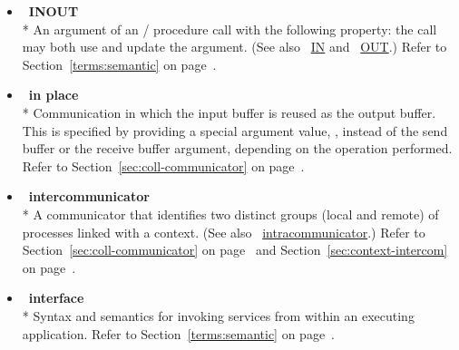 \begin{itemize}
\label{glossary:INOUT}
\item  ~\hypertarget{glossary:INOUT}{\textbf{INOUT}} \\*
An argument of an \MPI/ procedure call with the following property: the call may both use and update the argument.
(See also ~\hyperlink{glossary:IN}{IN} and ~\hyperlink{glossary:OUT}{OUT}.)
Refer to Section~\ref{terms:semantic} on page~\pageref{terms:semantic}.

\label{glossary:in_place}
\item  ~\hypertarget{glossary:in_place}{\textbf{in place}} \\*
Communication in which the input buffer is reused as the output buffer.
This is specified by
providing a special argument value, , instead of the
send buffer or the receive buffer argument,
depending on the operation performed. 
Refer to Section~\ref{sec:coll-communicator} on page~\pageref{sec:coll-communicatorr}.

\label{glossary:intercommunicator}
\item  ~\hypertarget{glossary:intercommunicator}{\textbf{intercommunicator}} \\*
A communicator that identifies two distinct groups (local and remote) of processes
linked with a context.  (See also ~\hyperlink{glossary:intracommunicator}{intracommunicator}.)
Refer to Section~\ref{sec:coll-communicator} on page~\pageref{sec:coll-communicator}  
and Section~\ref{sec:context-intercom} on page~\pageref{sec:context-intercom}.

\label{glossary:interface}
\item  ~\hypertarget{glossary:interface}{\textbf{interface}} \\*
Syntax and semantics for invoking services from within an executing application.  
Refer to Section~\ref{terms:semantic} on page~\pageref{terms:semantic}.


\end{itemize}
